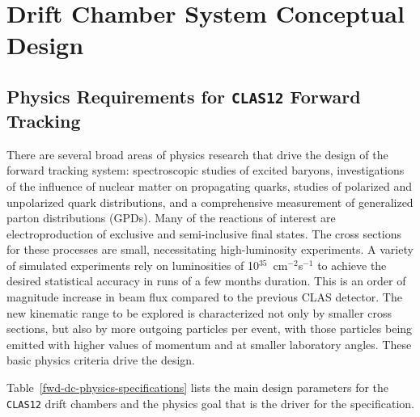 \section{Drift Chamber System Conceptual Design}



\subsection{Physics Requirements for {\tt CLAS12} Forward Tracking}

There are several broad areas of physics research that drive 
the design of the forward tracking system: 
spectroscopic studies of excited baryons, investigations of 
the influence of nuclear matter on propagating quarks, studies of polarized 
and unpolarized quark distributions, and a comprehensive measurement of 
generalized parton distributions (GPDs).  Many of the reactions of interest 
are electroproduction of exclusive and semi-inclusive final states.  The 
cross sections for these processes are small, necessitating high-luminosity 
experiments.  A variety of simulated experiments rely on luminosities of 
10$^{35}$~cm$^{-2}$s$^{-1}$ to achieve the desired statistical accuracy in 
runs of a few months duration.  This is an order of magnitude increase
in beam flux compared to the previous CLAS detector.  
The new kinematic range to be explored is 
characterized not only by smaller cross sections, but also by more outgoing 
particles per event, with those particles being emitted with higher values 
of momentum and at smaller laboratory angles.  These basic physics criteria 
drive the design. 


Table~\ref{fwd-dc-physics-specifications} lists the main design parameters for 
the {\tt CLAS12} drift chambers and the physics goal that is the driver
for the specification.  

